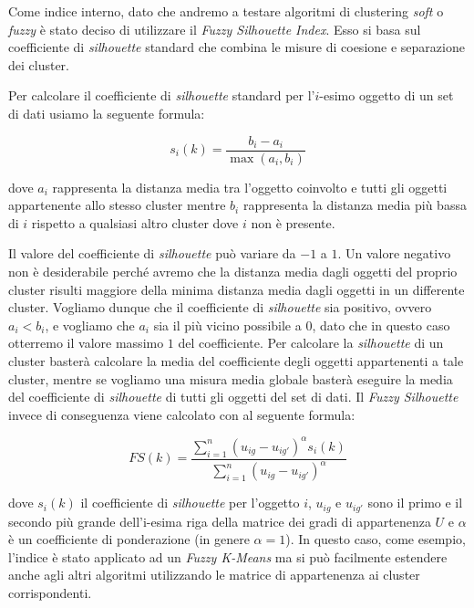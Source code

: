 \documentclass[12pt]{article}
\begin{document}
Come indice interno, dato che andremo a testare algoritmi di clustering \textit{soft} o \textit{fuzzy} è stato deciso di utilizzare il \textit{Fuzzy Silhouette Index}. Esso si basa sul coefficiente di \textit{silhouette} standard che combina le misure di coesione e separazione dei cluster. 

Per calcolare il coefficiente di \textit{silhouette} standard per l'$i$-esimo oggetto di un set di dati usiamo la seguente formula:

\begin{equation}
	s_i (k) = \frac{b_i-a_i}{\max(a_i,b_i)}
	\label{eq:silhouette}
\end{equation}

dove $a_i$ rappresenta la distanza media tra l'oggetto coinvolto e tutti gli oggetti
appartenente allo stesso cluster mentre $b_i$ rappresenta la distanza media più bassa di $i$ rispetto a qualsiasi altro cluster dove $i$ non è presente.

Il valore del coefficiente di \textit{silhouette} può variare da $-1$ a $1$. Un valore negativo non è desiderabile perché avremo che la distanza media dagli oggetti del proprio cluster risulti maggiore della minima distanza media dagli oggetti in un differente cluster. Vogliamo dunque che il coefficiente di \textit{silhouette} sia positivo, ovvero $a_i<b_i$, e vogliamo che $a_i$ sia il più vicino possibile a $0$, dato che in questo caso otterremo il valore massimo $1$ del coefficiente. Per calcolare la \textit{silhouette} di un cluster basterà calcolare la media del coefficiente degli oggetti appartenenti a tale cluster, mentre se vogliamo una misura media globale basterà eseguire la media del coefficiente di \textit{silhouette} di tutti gli oggetti del set di dati. Il \textit{Fuzzy Silhouette} invece di conseguenza viene calcolato con al seguente formula:

\begin{equation}
	FS(k) = \frac{\sum_{i=1}^n (u_{ig} - u_{ig'})^\alpha s_i(k)}{\sum_{i=1}^{n} (u_{ig}-u_{ig'})^\alpha}
	\label{eq:fuzzySilhouette}
\end{equation}

dove $s_i (k)$ il coefficiente di \textit{silhouette} per l'oggetto $i$, $u_{ig}$ e $u_{ig'}$ sono il primo e il secondo più grande dell'i-esima riga della matrice dei gradi di appartenenza $U$ e $\alpha$ è un coefficiente di ponderazione (in genere $\alpha = 1$). In questo caso, come esempio, l'indice è stato applicato ad un \textit{Fuzzy K-Means} ma si può facilmente estendere anche agli altri algoritmi utilizzando le matrice di appartenenza ai cluster corrispondenti.
\end{document}
